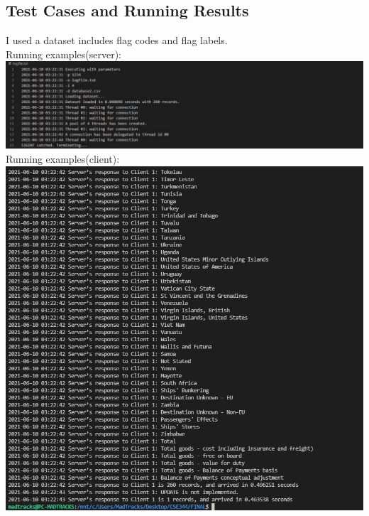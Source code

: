 \documentclass[12pt]{article}
\begin{document}
\subsection{Test Cases and Running Results}
I used a dataset includes flag codes and flag labels.\\
Running examples(server):\\
\includegraphics[]{"server_example.jpg"}\\
Running examples(client):\\
\includegraphics[]{"client_example.jpg"}\\
\end{document}
